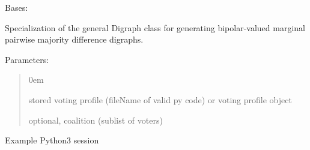\documentclass[letterpaper,10pt,english]{sphinxmanual}
\begin{document}
\begin{fulllineitems}
\label{techDoc:votingDigraphs.CondorcetDigraph}
Bases: {\hyperref[techDoc:digraphs.Digraph]{\emph{}}}

Specialization of the general Digraph class for generating
bipolar-valued marginal pairwise majority difference digraphs.

Parameters:
\begin{quote}

\begin{DUlineblock}{0em}
\item[] stored voting profile (fileName of valid py code) or voting profile object
\item[] optional, coalition (sublist of voters)
\end{DUlineblock}
\end{quote}

Example Python3 session


\end{fulllineitems}
\end{document}
